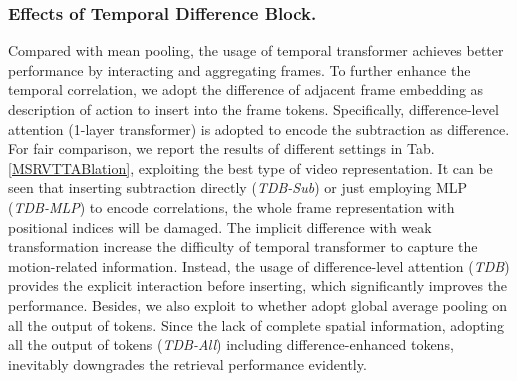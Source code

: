 \documentclass[final]{cvpr}
\begin{document}
\subsubsection{Effects of Temporal Difference Block.} Compared with mean pooling, the usage of temporal transformer achieves better performance by interacting and aggregating frames. To further enhance the temporal correlation, we adopt the difference of adjacent frame embedding as description of action to insert into the frame tokens. Specifically, difference-level attention (1-layer transformer) is adopted to encode the subtraction as difference. 
For fair comparison, we report the results of different settings in Tab.\ref{MSRVTTABlation}, exploiting the best type of video representation. It can be seen that inserting subtraction directly (\textit{TDB-Sub}) or just employing MLP (\textit{TDB-MLP}) to encode correlations, the whole frame representation with positional indices will be damaged.
The implicit difference with weak transformation increase the difficulty of temporal transformer to capture the motion-related information. Instead, the usage of  difference-level attention (\textit{TDB}) provides the explicit interaction before inserting, which significantly improves the performance. Besides, we also exploit to whether adopt global average pooling on all the output of tokens. Since the lack of complete spatial information, adopting all the output of tokens (\textit{TDB-All}) including difference-enhanced tokens, inevitably downgrades the retrieval performance evidently.
\end{document}
